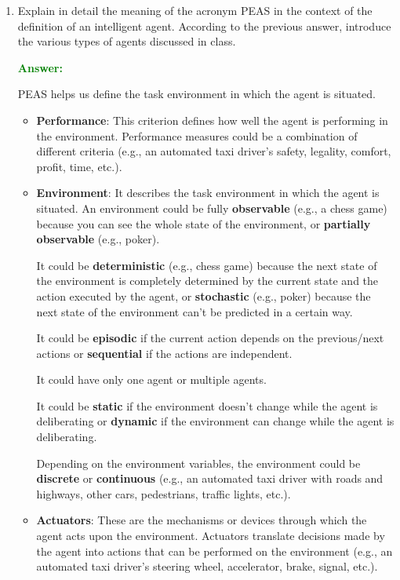 \documentclass[12pt]{article}
\begin{document}
\begin{enumerate}[label=\textbf{A.\arabic*}]
    \item Explain in detail the meaning of the acronym PEAS in the context of the definition of an intelligent agent.
          According to the previous answer, introduce the various types of agents discussed in class.

          \textcolor{green}{\textbf{Answer:}}

          PEAS helps us define the task environment in which the agent is situated.

          \begin{itemize}
              \item \textbf{Performance}: This criterion defines how well the agent is performing in the environment. Performance measures could be a combination of different criteria (e.g., an automated taxi driver's safety, legality, comfort, profit, time, etc.).

              \item \textbf{Environment}: It describes the task environment in which the agent is situated. An environment could be fully \textbf{observable} (e.g., a chess game) because you can see the whole state of the environment, or \textbf{partially observable} (e.g., poker).

                    It could be \textbf{deterministic} (e.g., chess game) because the next state of the environment is completely determined by the current state and the action executed by the agent, or \textbf{stochastic} (e.g., poker) because the next state of the environment can't be predicted in a certain way.

                    It could be \textbf{episodic} if the current action depends on the previous/next actions or \textbf{sequential} if the actions are independent.

                    It could have only one agent or multiple agents.

                    It could be \textbf{static} if the environment doesn't change while the agent is deliberating or \textbf{dynamic} if the environment can change while the agent is deliberating.

                    Depending on the environment variables, the environment could be \textbf{discrete} or \textbf{continuous} (e.g., an automated taxi driver with roads and highways, other cars, pedestrians, traffic lights, etc.).

              \item \textbf{Actuators}: These are the mechanisms or devices through which the agent acts upon the environment. Actuators translate decisions made by the agent into actions that can be performed on the environment (e.g., an automated taxi driver's steering wheel, accelerator, brake, signal, etc.).


\end{itemize}
\end{enumerate}
\end{document}
